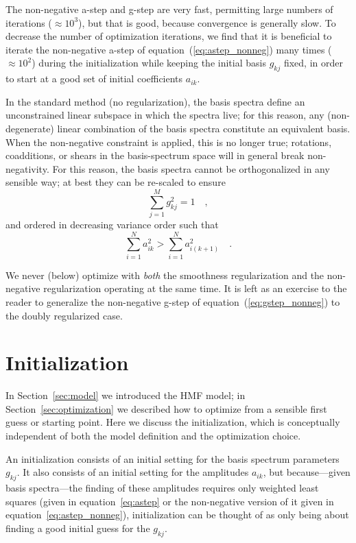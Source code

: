 \documentclass[12pt,preprint]{aastex}
\newcommand{\sectionname}{Section}
\newcommand{\equationname}{equation}
\begin{document}
The non-negative a-step and g-step are very fast, permitting large
numbers of iterations ($\approx 10^3$), but that is good, because
convergence is generally slow.  To decrease the number of optimization
iterations, we find that it is beneficial to iterate the non-negative
a-step of \equationname~(\ref{eq:astep_nonneg}) many times ($\approx
10^2$) during the initialization while keeping the initial basis
$g_{kj}$ fixed, in order to start at a good set of initial
coefficients $a_{ik}$.

In the standard method (no regularization), the basis spectra define
an unconstrained linear subspace in which the spectra live; for this
reason, any (non-degenerate) linear combination of the basis spectra
constitute an equivalent basis.  When the non-negative constraint is
applied, this is no longer true; rotations, coadditions, or shears in
the basis-spectrum space will in general break non-negativity.  For
this reason, the basis spectra cannot be orthogonalized in any
sensible way; at best they can be re-scaled to ensure
\begin{equation}\label{eq:nnnormalization}
\sum_{j=1}^{M}g_{kj}^2 = 1
\quad ,
\end{equation}
and ordered in decreasing variance order such that
\begin{equation}\label{eq:nnordering}
\sum_{i=1}^{N}a_{ik}^2>\sum_{i=1}^{N}a_{i(k+1)}^2
\quad .
\end{equation}

We never (below) optimize with \emph{both} the smoothness
regularization and the non-negative regularization operating at the
same time.  It is left as an exercise to the reader to generalize the
non-negative g-step of \equationname~(\ref{eq:gstep_nonneg}) to the
doubly regularized case.

\section{Initialization}\label{sec:initialization}

In \sectionname~\ref{sec:model} we introduced the HMF model; in
\sectionname~\ref{sec:optimization} we described how to optimize from
a sensible first guess or starting point.  Here we discuss the
initialization, which is conceptually independent of both the model
definition and the optimization choice.

An initialization consists of an initial setting for the basis
spectrum parameters $g_{kj}$.  It also consists of an initial setting
for the amplitudes $a_{ik}$, but because---given basis spectra---the
finding of these amplitudes requires only weighted least squares
(given in \equationname~\ref{eq:astep} or the non-negative version of
it given in \equationname~\ref{eq:astep_nonneg}), initialization can
be thought of as only being about finding a good initial guess for the
$g_{kj}$.
\end{document}
